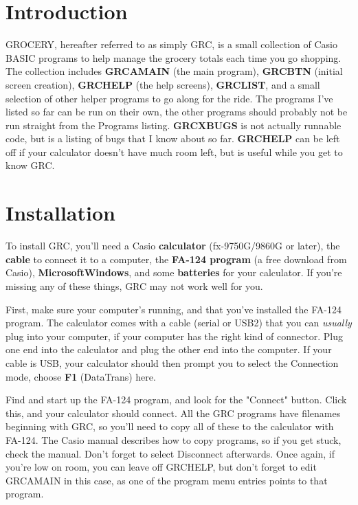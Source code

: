 \documentclass[]{article}
\begin{document}
\maketitle
	
\section{Introduction}

GROCERY, hereafter referred to as simply GRC, is a small collection of Casio BASIC programs
to help manage the grocery totals each time you go shopping. The collection includes {\bf GRCAMAIN} 
(the main program), {\bf GRCBTN} (initial screen creation), {\bf GRCHELP} (the help screens), {\bf GRCLIST},
and a small selection of other helper programs to go along for the ride. The programs I've listed so far
can be run on their own, the other programs should probably not be run straight from the Programs listing.
{\bf GRCXBUGS } is not actually runnable code, but is a listing of bugs that I know about so far. {\bf GRCHELP} can be
left off if your calculator doesn't have much room left, but is useful while you get to know GRC.


\section{Installation}

To install GRC, you'll need a Casio {\bf calculator} (fx-9750G/9860G or later), the {\bf cable} to connect
it to a computer, the {\bf FA-124 program} (a free download from Casio), {\bf Microsoft\trade Windows\trade}, and
some {\bf batteries} for your calculator. If you're missing any of these things, GRC may not work well for you.

First, make sure your computer's running, and that you've installed the FA-124 program.
The calculator comes with a cable (serial or USB2) that you can { \it usually \/} plug
into your computer, if your computer has the right kind of connector. Plug one end into
the calculator and plug the other end into the computer. If your cable is USB, your calculator
should then prompt you to select the Connection mode, choose {\bf F1} (DataTrans) here.

Find and start up the FA-124 program, and look for the "Connect" button. Click this, and
your calculator should connect.
All the GRC programs have filenames beginning with GRC, so you'll need to copy all of these to the calculator with FA-124. The Casio manual
describes how to copy programs, so if you get stuck, check the manual. Don't forget to select Disconnect afterwards. Once again, if you're low
on room, you can leave off GRCHELP, but don't forget to edit GRCAMAIN in this case, as one of the program menu entries points to that program.
\end{document}

